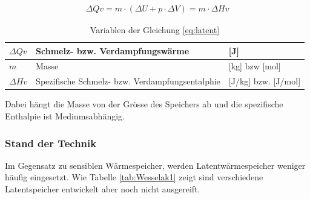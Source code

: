 \documentclass[11pt,a4paper]{scrartcl}
\begin{document}
\begin{align}
\Delta Qv = m \cdot (\Delta U + p \cdot \Delta V) = m \cdot \Delta Hv
\label{eq:latent}
\end{align}

\begin{table}[h!]
\begin{center}
\begin{tabular}{|l|p{5cm}|l|}
\hline $\Delta Qv$ & Schmelz- bzw. Verdampfungswärme & [J] \\
\hline $m$ & Masse & [kg] bzw [mol] \\
\hline $\Delta Hv$ & Spezifische Schmelz- bzw. Verdampfungsentalphie & [J/kg]
bzw. [J/mol] \\
\hline
\end{tabular}
\caption{Variablen der Gleichung \ref{eq:latent}}
\end{center}
\end{table}

Dabei hängt die Masse von der Grösse des Speichers ab und die spezifische
Enthalpie ist Mediumsabhängig.


\subsubsection{Stand der Technik}
Im Gegensatz zu sensiblen Wärmespeicher, werden Latentwärmespeicher weniger
häufig eingesetzt. Wie Tabelle \ref{tab:Wesselak1} zeigt sind verschiedene
Latentspeicher entwickelt aber noch nicht ausgereift.
\end{document}
